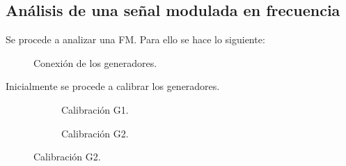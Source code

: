   \subsection{Análisis de una señal modulada en frecuencia}

    Se procede a analizar una FM. Para ello se hace lo siguiente:

      \begin{figure}[H]
        \centering
          \caption{Conexión de los generadores.}
          \label{fig:Exp6EsquemaGeneradores}
      \end{figure}

    Inicialmente se procede a calibrar los generadores.

      \begin{figure}[H]
        \centering
        \begin{subfigure}[H]{0.48\textwidth}
          \caption{Calibración G1.}
          \label{fig:Exp6CalibracionG1}
        \end{subfigure}
        \hfill 
        \begin{subfigure}[H]{0.48\textwidth}
          \caption{Calibración G2.}
          \label{fig:Exp6CalibracionG1}
        \end{subfigure}
      \end{figure}

